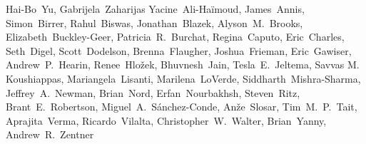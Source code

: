 \begin{raggedright}
Hai-Bo~Yu,
Gabrijela~Zaharijas
Yacine~Ali-Ha\"imoud,
James~Annis,
Simon~Birrer,
Rahul~Biswas,
Jonathan~Blazek,
Alyson~M.~Brooks,
Elizabeth~Buckley-Geer,
Patricia~R.~Burchat,
Regina~Caputo,
Eric~Charles,
Seth~Digel,
Scott~Dodelson,
Brenna~Flaugher,
Joshua~Frieman,
Eric~Gawiser,
Andrew~P.~Hearin,
Renee~Hlo\v{z}ek,
Bhuvnesh~Jain,
Tesla~E.~Jeltema,
Savvas M. Koushiappas,
Mariangela~Lisanti,
Marilena~LoVerde,
Siddharth~Mishra-Sharma,
Jeffrey~A.~Newman,
Brian~Nord,
Erfan~Nourbakhsh,
Steven~Ritz,
Brant~E.~Robertson,
Miguel~A.~S\'anchez-Conde,
An\v{z}e~Slosar,
Tim~M.~P.~Tait,
Aprajita~Verma,
Ricardo~Vilalta,
Christopher~W.~Walter,
Brian~Yanny,
Andrew~R.~Zentner

\end{raggedright}